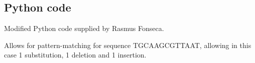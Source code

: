\begin{appendices}
\section{Python code}
\label{app:py}
Modified Python code supplied by Rasmus Fonseca.

Allows for pattern-matching for sequence TGCAAGCGTTAAT, allowing in this case 1 substitution, 1 deletion and 1 insertion.
\end{appendices}
